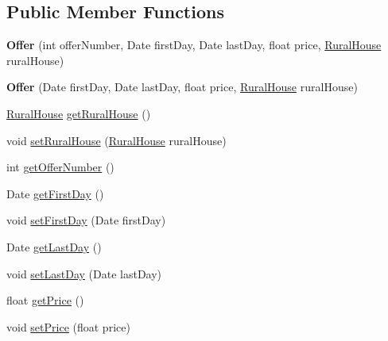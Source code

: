 \subsection*{Public Member Functions}
\begin{DoxyCompactItemize}
\item 
\mbox{\label{classdomain_1_1_offer_a86a7d5eec8c0f93f844e15e057a34555}} 
{\bfseries Offer} (int offer\+Number, Date first\+Day, Date last\+Day, float price, \mbox{\hyperlink{classdomain_1_1_rural_house}{Rural\+House}} rural\+House)
\item 
\mbox{\label{classdomain_1_1_offer_ae977cf0dae1332eb9d0b97252cc15078}} 
{\bfseries Offer} (Date first\+Day, Date last\+Day, float price, \mbox{\hyperlink{classdomain_1_1_rural_house}{Rural\+House}} rural\+House)
\item 
\mbox{\hyperlink{classdomain_1_1_rural_house}{Rural\+House}} \mbox{\hyperlink{classdomain_1_1_offer_a3804f5f9ad3a3bf380e55389ccfa9dba}{get\+Rural\+House}} ()
\item 
void \mbox{\hyperlink{classdomain_1_1_offer_a2050ed4cf76a2a2863d08e89bdf4a7df}{set\+Rural\+House}} (\mbox{\hyperlink{classdomain_1_1_rural_house}{Rural\+House}} rural\+House)
\item 
int \mbox{\hyperlink{classdomain_1_1_offer_ab9e27c474ec6819a27eac1847d876c3a}{get\+Offer\+Number}} ()
\item 
Date \mbox{\hyperlink{classdomain_1_1_offer_ae13ac55ba469cb34e004d6aff68430fb}{get\+First\+Day}} ()
\item 
void \mbox{\hyperlink{classdomain_1_1_offer_aca5c8e3d34e700c8e51d1c9a0685e68f}{set\+First\+Day}} (Date first\+Day)
\item 
Date \mbox{\hyperlink{classdomain_1_1_offer_a8bf48365a8fc185dbdcaac80a9d84444}{get\+Last\+Day}} ()
\item 
void \mbox{\hyperlink{classdomain_1_1_offer_a52363278771059c51820160889c2bed1}{set\+Last\+Day}} (Date last\+Day)
\item 
float \mbox{\hyperlink{classdomain_1_1_offer_a4ebf9c6f415709b527e006fdffa3a0c3}{get\+Price}} ()
\item 
void \mbox{\hyperlink{classdomain_1_1_offer_a8bd526902732e030571b6889c5507f4c}{set\+Price}} (float price)
\item 
\mbox{\label{classdomain_1_1_offer_a8838b2d4c6616394f1829d4dc5572952}} 

\end{DoxyCompactItemize}
